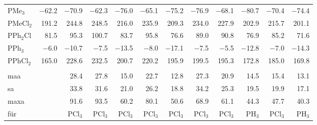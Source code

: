 \begin{table}[ht!]
{\begin{tabular}{lr|rrrrr|rrrrr}
    PMe$_{3}$  & $-$62.2 & $-$70.9 & $-$62.3 & $-$76.0 & $-$65.1 & $-$75.2 & $-$76.9 & $-$68.1 & $-$80.7 & $-$70.4 & $-$74.4 \\
    PMeCl$_{2}$ & 191.2 & 244.8 & 248.5 & 216.0 & 235.9 & 209.3 & 234.0 & 227.9 & 202.9 & 215.7 & 201.1 \\
    PPh$_{2}$Cl & 81.5  & 95.3  & 100.7 & 83.7  & 95.8  & 76.6  & 89.0  & 90.8  & 76.9  & 85.2  & 71.6 \\
    PPh$_{3}$  & $-$6.0  & $-$10.7 & $-$7.5  & $-$13.5 & $-$8.0  & $-$17.1 & $-$7.5  & $-$5.5  & $-$12.8 & $-$7.0  & $-$14.3 \\
    PPhCl$_{2}$ & 165.0 & 228.6 & 232.5 & 200.7 & 220.2 & 195.9 & 199.5 & 195.3 & 172.8 & 185.0 & 169.8 \\
          &       &       &       &       &       &       &       &       &       &       &  \\
    \ac{maa}   &       & 28.4  & 27.8  & 15.0  & 22.7  & 12.8  & 27.3  & 20.9  & 14.5  & 15.4  & 13.1 \\
    \ac{sa}   &       & 33.8  & 31.6  & 21.0  & 26.2  & 18.8  & 34.2  & 25.3  & 19.5  & 19.9  & 17.1 \\
    \ac{maxa}  &       & 91.6  & 93.5  & 60.2  & 80.1  & 50.6  & 68.9  & 61.1  & 44.3  & 47.7  & 40.3 \\
    für & & PCl$_{3}$ & PCl$_{3}$ & PCl$_{3}$ & PCl$_{3}$ & PCl$_{3}$ & PCl$_{3}$ & PCl$_{3}$ & PH$_{3}$ & PCl$_{3}$ & PH$_{3}$
    \end{tabular}%
  \label{tab:pshifts}}%
\end{table}%

